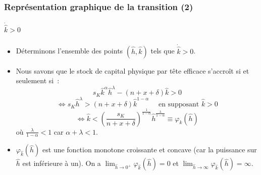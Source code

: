 \documentclass[10pt,notheorems]{beamer}
\theoremstyle{plain}
\theoremstyle{definition} %
\begin{document}
\begin{frame}
  \frametitle{Représentation graphique de la transition (2)}
  \framesubtitle{$\dot{\hat k}>0$}
  \begin{itemize}

  \item Déterminons l'ensemble des points $(\hat h, \hat k)$ tels que $\dot{\hat k}>0$.\newline

  \item Nous savons que le stock de capital physique par tête efficace s'accroît si et seulement si~:
    \[
      s_K\hat k^\alpha \hat h^\lambda - (n+x+\delta) \hat k > 0
    \]
    \[
      \Leftrightarrow s_K\hat h^\lambda > (n+x+\delta) \hat k^{1-\alpha}\quad\text{ en supposant }\hat k>0
    \]
    \[
      \Leftrightarrow \hat k < \left(\frac{s_K}{n+x+\delta}\right)^{\frac{1}{1-\alpha}} \hat h^{\frac{\lambda}{1-\alpha}}\equiv \varphi_{\hat k}(\hat h)
    \]
    où $\frac{\lambda}{1-\alpha}<1$ car $\alpha+\lambda<1$.\newline

  \item $\varphi_{\hat k}(\hat h)$ est une fonction monotone croissante et concave (car la puissance sur $\hat h$ est inférieure à un). On a $\lim_{\hat h\rightarrow 0^+}\varphi_{\hat k}(\hat h) = 0$ et $\lim_{\hat h\rightarrow \infty}\varphi_{\hat k}(\hat h) = \infty$.\newline

  \end{itemize}

\end{frame}
\end{document}
